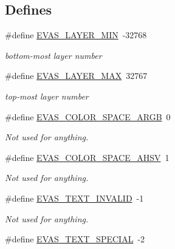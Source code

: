 \subsection*{Defines}
\begin{DoxyCompactItemize}
\item 
\#define \hyperlink{Evas_8h_a8817f2ac4e0058d43f9bfe1e563e551b}{EVAS\_\-LAYER\_\-MIN}~-\/32768\label{Evas_8h_a8817f2ac4e0058d43f9bfe1e563e551b}

\begin{DoxyCompactList}\small\item\em bottom-\/most layer number \item\end{DoxyCompactList}\item 
\#define \hyperlink{Evas_8h_a1456f5c97f03ebd786c49d4d1178e7a0}{EVAS\_\-LAYER\_\-MAX}~32767\label{Evas_8h_a1456f5c97f03ebd786c49d4d1178e7a0}

\begin{DoxyCompactList}\small\item\em top-\/most layer number \item\end{DoxyCompactList}\item 
\#define \hyperlink{Evas_8h_a37fdd5a69b7ea8e46140ef147aef8192}{EVAS\_\-COLOR\_\-SPACE\_\-ARGB}~0\label{Evas_8h_a37fdd5a69b7ea8e46140ef147aef8192}

\begin{DoxyCompactList}\small\item\em Not used for anything. \item\end{DoxyCompactList}\item 
\#define \hyperlink{Evas_8h_a94722d391c46d7c062e13447d9877e71}{EVAS\_\-COLOR\_\-SPACE\_\-AHSV}~1\label{Evas_8h_a94722d391c46d7c062e13447d9877e71}

\begin{DoxyCompactList}\small\item\em Not used for anything. \item\end{DoxyCompactList}\item 
\#define \hyperlink{Evas_8h_ad143a67f2f6f649135d84f8a55a6766a}{EVAS\_\-TEXT\_\-INVALID}~-\/1\label{Evas_8h_ad143a67f2f6f649135d84f8a55a6766a}

\begin{DoxyCompactList}\small\item\em Not used for anything. \item\end{DoxyCompactList}\item 
\#define \hyperlink{Evas_8h_a895e0e75635b4de42f815d3281fd81be}{EVAS\_\-TEXT\_\-SPECIAL}~-\/2\label{Evas_8h_a895e0e75635b4de42f815d3281fd81be}


\end{DoxyCompactItemize}
